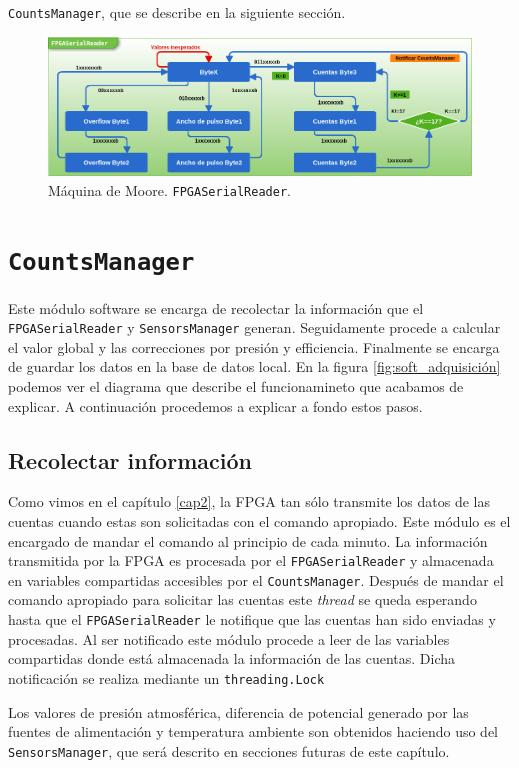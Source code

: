         \texttt{CountsManager}, que se describe en la siguiente sección.
        \begin{figure}[h]
            \centering
            \includegraphics[keepaspectratio, width=1\textwidth]{./img/reader.png}
            \caption{Máquina de Moore. \texttt{FPGASerialReader}.}   
            \label{fig:reader}
        \end{figure}


    \section{\texttt{CountsManager}}
        Este módulo software se encarga de recolectar la información que el
        \texttt{FPGASerialReader} y \texttt{SensorsManager} generan.
        Seguidamente procede a calcular el valor global y las correcciones por
        presión y efficiencia. Finalmente se encarga de guardar los datos en la
        base de datos local. En la figura \ref{fig:soft_adquisición} podemos
        ver el diagrama que describe el funcionamineto que acabamos de
        explicar. A continuación procedemos a explicar a fondo estos pasos.
        \subsection{Recolectar información}
            Como vimos en el capítulo \ref{cap2}, la FPGA tan sólo
            transmite los datos de las cuentas cuando estas son solicitadas con
            el comando apropiado. Este módulo es el encargado de mandar el
            comando al principio de cada minuto. La información transmitida por
            la FPGA es procesada por el \texttt{FPGASerialReader} y almacenada
            en variables compartidas accesibles por el \texttt{CountsManager}.
            Después de mandar el comando apropiado para solicitar las cuentas
            este \emph{thread} se queda esperando hasta que el
            \texttt{FPGASerialReader} le notifique que las cuentas han sido
            enviadas y procesadas. Al ser notificado este módulo procede a leer
            de las variables compartidas donde está almacenada la información
            de las cuentas. Dicha notificación se realiza mediante un
            \texttt{threading.Lock}
            \par
            Los valores de presión atmosférica, diferencia de potencial generado por las fuentes de alimentación y temperatura ambiente son
            obtenidos haciendo uso del \texttt{SensorsManager}, que será descrito en secciones futuras de este capítulo.
